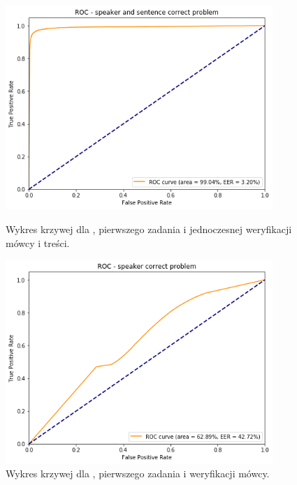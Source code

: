 \begin{figure}[H]
    \centering
    \begin{minipage}{.5\textwidth}
        \centering
        \includegraphics[width=0.9\textwidth]{images/4_3_gmm_roc_both}
        \caption{Wykres krzywej  dla , pierwszego zadania  i jednoczesnej weryfikacji mówcy i treści.}
        \label{fig:4_3_gmm_roc_both}
    \end{minipage}%
    \begin{minipage}{.5\textwidth}
        \centering
        \includegraphics[width=0.9\textwidth]{images/4_3_dnn_roc_speaker}
        \caption{Wykres krzywej  dla , pierwszego zadania  i weryfikacji mówcy.}
        \label{fig:4_3_dnn_roc_speaker}
    \end{minipage}
\end{figure}

